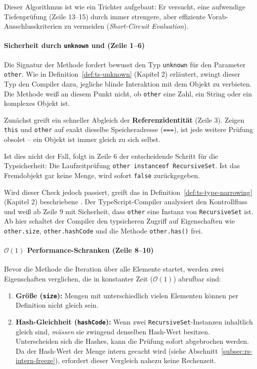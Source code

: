 Dieser Algorithmus ist wie ein Trichter aufgebaut: Er versucht, eine aufwendige Tiefenprüfung (Zeile 13–15) durch immer strengere, aber effiziente Vorab-Ausschlusskriterien zu vermeiden (\textit{Short-Circuit Evaluation}).

\paragraph*{Sicherheit durch \texttt{unknown} und  (Zeile 1–6)}
Die Signatur der Methode fordert bewusst den Typ \texttt{unknown} für den Parameter \texttt{other}. Wie in Definition~\ref{def:ts-unknown} (Kapitel 2) erläutert, zwingt dieser Typ den Compiler dazu, jegliche blinde Interaktion mit dem Objekt zu verbieten. Die Methode weiß an diesem Punkt nicht, ob \texttt{other} eine Zahl, ein String oder ein komplexes Objekt ist.

Zunächst greift ein schneller Abgleich der \textbf{Referenzidentität} (Zeile 3). Zeigen \texttt{this} und \texttt{other} auf exakt dieselbe Speicheradresse (\texttt{===}), ist jede weitere Prüfung obsolet – ein Objekt ist immer gleich zu sich selbst.

Ist dies nicht der Fall, folgt in Zeile 6 der entscheidende Schritt für die Typsicherheit: Die Laufzeitprüfung \texttt{other instanceof RecursiveSet}. Ist das Fremdobjekt gar keine Menge, wird sofort \texttt{false} zurückgegeben. 

Wird dieser Check jedoch passiert, greift das in Definition~\ref{def:ts-type-narrowing} (Kapitel 2) beschriebene \textbf{}. Der TypeScript-Compiler analysiert den Kontrollfluss und weiß ab Zeile 9 mit Sicherheit, dass \texttt{other} eine Instanz von \texttt{RecursiveSet} ist. Ab hier schaltet der Compiler den typsicheren Zugriff auf Eigenschaften wie \texttt{other.size}, \texttt{other.hashCode} und die Methode \texttt{other.has()} frei.

\paragraph*{$\mathcal{O}(1)$ Performance-Schranken (Zeile 8–10)}
Bevor die Methode die Iteration über alle Elemente startet, werden zwei Eigenschaften verglichen, die in konstanter Zeit ($\mathcal{O}(1)$) abrufbar sind:
\begin{enumerate}
    \item \textbf{Größe (\texttt{size}):} Mengen mit unterschiedlich vielen Elementen können per Definition nicht gleich sein.
    \item \textbf{Hash-Gleichheit (\texttt{hashCode}):} Wenn zwei \texttt{RecursiveSet}-Instanzen inhaltlich gleich sind, \emph{müssen} sie zwingend denselben Hash-Wert besitzen. Unterscheiden sich die Hashes, kann die Prüfung sofort abgebrochen werden. Da der Hash-Wert der Menge intern gecacht wird (siehe Abschnitt~\ref{subsec:rs-intern-freeze}), erfordert dieser Vergleich nahezu keine Rechenzeit.
\end{enumerate}

